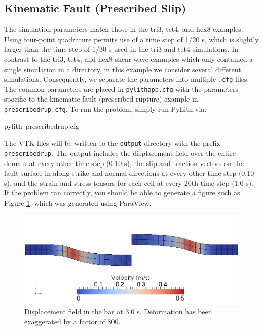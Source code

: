 \subsection{Kinematic Fault (Prescribed Slip)}

The simulation parameters match those in the tri3, tet4, and hex8
examples. Using four-point quadrature permits use of a time step of
1/20 s, which is slightly larger than the time step of 1/30 s used
in the tri3 and tet4 simulations. In contrast to the tri3, tet4, and
hex8 shear wave examples which only contained a single simulation
in a directory, in this example we consider several different simulations.
Consequently, we separate the parameters into multiple \texttt{.cfg}
files. The common parameters are placed in \texttt{pylithapp.cfg}
with the parameters specific to the kinematic fault (prescribed rupture)
example in \texttt{prescribedrup.cfg}. To run the problem, simply
run PyLith via:
\begin{lyxcode}
pylith~prescribedrup.cfg
\end{lyxcode}
The VTK files will be written to the \texttt{output} directory with
the prefix \texttt{prescribedrup}. The output includes the displacement
field over the entire domain at every other time step (0.10 s), the
slip and traction vectors on the fault surface in along-strike and
normal directions at every other time step (0.10 s), and the strain
and stress tensors for each cell at every 20th time step (1.0 s).
If the problem ran correctly, you should be able to generate a figure
such as Figure \ref{fig:shearwave:quad4:kinematic}, which was generated
using ParaView.

\noindent \begin{center}
\begin{figure}
\begin{centering}
\includegraphics[scale=0.5]{tutorials/shearwave/figs/quad4kinematic30}
\par\end{centering}

\caption{Displacement field in the bar at 3.0 s. Deformation has been exaggerated
by a factor of 800.\label{fig:shearwave:quad4:kinematic}}
\end{figure}

\par\end{center}



